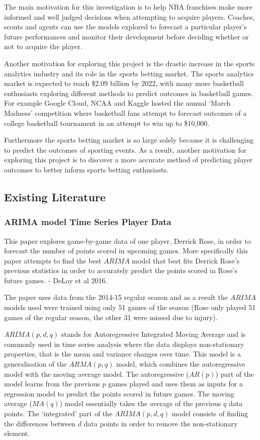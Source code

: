 \documentclass[a4paper,11pt,twoside]{article}
\begin{document}
The main motivation for this investigation is to help NBA franchises make more informed and well judged decisions when attempting to acquire players. Coaches, scouts and agents can use the models explored  to forecast a particular player's future performances and monitor their development before deciding whether or not to acquire the player. 

Another motivation for exploring this project is the drastic increase in the sports analytics industry and its role in the sports betting market. The sports analytics market is expected to reach \$2.09 billion by 2022, with many more basketball enthusiasts exploring different methods to predict outcomes in basketball games. For example Google Cloud, NCAA and Kaggle hosted the annual `March Madness' competition where basketball fans attempt to forecast outcomes of a college basketball tournament in an attempt to win up to \$10,000.

 Furthermore the sports betting market is so large solely because it is challenging to predict the outcomes of sporting events. As a result, another motivation for exploring this project is to discover a more accurate method of predicting player outcomes to better inform sports betting enthusiasts. 



\subsection{Existing Literature}
 
\subsubsection{ARIMA model Time Series Player Data}

This paper explores game-by-game data of one player, Derrick Rose, in order to forecast the number of points scored in upcoming games. More specifically this paper attempts to find the best $ARIMA$ model that best fits Derrick Rose's previous statistics in order to accurately predict the points scored in Rose's future games. - DeLay et al 2016.

The paper uses data from the 2014-15 regular season and as a result the $ARIMA$ models used  were trained using only 51 games of the season (Rose only played 51 games of the regular season, the other 31 were missed due to injury).

$ARIMA(p,d,q)$ stands for Autoregressive Integrated Moving Average and is commonly used in time series analysis where the data displays non-stationary properties, that is the mean and variance changes over time. This model is a generalisation of the $ARMA(p,q)$ model, which combines the autoregressive model with the moving average model. The autoregressive ($AR(p)$) part of the model learns from the previous $p$ games played and uses them as inputs for a regression model to predict the points scored in future games. The moving average ($MA(q)$) model essentially takes the average of the previous $q$ data points. The `integrated' part of the $ARIMA(p,d,q)$ model consists of finding the differences between $d$ data points in order to remove the non-stationary element.
\end{document}
